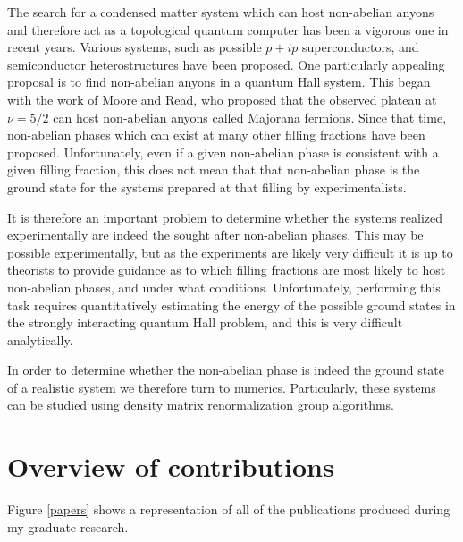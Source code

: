 The search for a condensed matter system which can host non-abelian anyons and therefore act as a topological quantum computer has been a vigorous one in recent years. Various systems, such as possible $p+ip$ superconductors, and semiconductor heterostructures have been proposed. One particularly appealing proposal is to find non-abelian anyons in a quantum Hall system. This began with the work of Moore and Read, who proposed that the observed plateau at $\nu=5/2$ can host non-abelian anyons called Majorana fermions. Since that time, non-abelian phases which can exist at many other filling fractions have been proposed\cite{ReadRezayi,BondersonSlingerland}. Unfortunately, even if a given non-abelian phase is consistent with a given filling fraction, this does not mean that that non-abelian phase is the ground state for the systems prepared at that filling by experimentalists. 

It is therefore an important problem to determine whether the systems realized experimentally are indeed the sought after non-abelian phases. This may be possible experimentally, but as the experiments are likely very difficult it is up to theorists to provide guidance as to which filling fractions are most likely to host non-abelian phases, and under what conditions. Unfortunately, performing this task requires quantitatively estimating the energy of the possible ground states in the strongly interacting quantum Hall problem, and this is very difficult analytically.

In order to determine whether the non-abelian phase is indeed the ground state of a realistic system we therefore turn to numerics. Particularly, these systems can be studied using density matrix renormalization group algorithms\cite{Zaletel}. 

\section{Overview of contributions}

Figure \ref{papers} shows a representation of all of the publications produced during my graduate research.  
